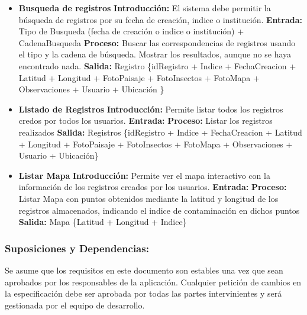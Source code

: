 \begin{enumerate}[A.]
\begin{itemize}
            \item \textbf{Busqueda de registros}
                \tab\textbf{Introducción:} El sistema debe permitir la búsqueda de registros por su fecha de creación, indice o institución.
                \tab\textbf{Entrada:} Tipo de Busqueda (fecha de creación o indice o institución) + CadenaBusqueda
                \tab\textbf{Proceso:} Buscar las correspondencias de registros usando el tipo y la cadena de búsqueda. Mostrar los resultados, aunque no se haya encontrado nada.
                \tab\textbf{Salida:} Registro \{idRegistro + Indice + FechaCreacion + Latitud + Longitud + FotoPaisaje + FotoInsectos + FotoMapa + Observaciones + Usuario + Ubicación \}

            \item \textbf{Listado de Registros}
                \tab\textbf{Introducción:} Permite listar todos los registros credos por todos los usuarios.
                \tab\textbf{Entrada:} 
                \tab\textbf{Proceso:} Listar los registros realizados
                \tab\textbf{Salida:} Registros \{idRegistro + Indice + FechaCreacion + Latitud + Longitud + FotoPaisaje + FotoInsectos + FotoMapa + Observaciones + Usuario + Ubicación\}

            \item \textbf{Listar Mapa}
                \tab\textbf{Introducción:} Permite ver el mapa interactivo con la información de los registros creados por los usuarios.
                \tab\textbf{Entrada:} 
                \tab\textbf{Proceso:} Listar Mapa con puntos obtenidos mediante la latitud y longitud de los registros almacenados, indicando el indice de contaminación en dichos puntos
                \tab\textbf{Salida:} Mapa \{Latitud + Longitud + Indice\}
        \end{itemize}
\end{enumerate}
         
        \subsubsection{Suposiciones y Dependencias:}
        
            
            Se asume que los requisitos en este documento son estables una vez que sean aprobados por los responsables de la aplicación. Cualquier petición de cambios en la especificación debe ser aprobada por todas las partes intervinientes y será gestionada por el equipo de desarrollo.
            
